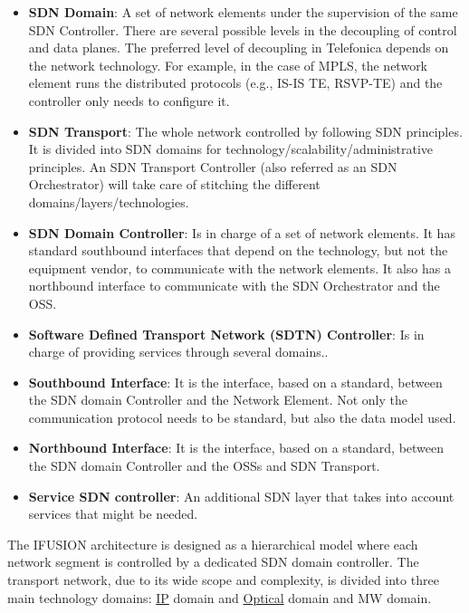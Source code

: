 \documentclass[a4paper,fleqn]{cas-dc}
\begin{document}
\begin{itemize}
\item \textbf{SDN Domain}: A set of network elements under the supervision of the same SDN Controller. There are several possible levels in the decoupling of control and data planes. The preferred level of decoupling in Telefonica depends on the network technology. For example, in the case of MPLS, the network element runs the distributed protocols (e.g., IS-IS TE, RSVP-TE) and the controller only needs to configure it.

\item \textbf{SDN Transport}: The whole network controlled by following SDN principles. It is divided into SDN domains for technology/scalability/administrative principles. An SDN Transport Controller (also referred as an SDN Orchestrator) will take care of stitching the different domains/layers/technologies.

\item \textbf{SDN Domain Controller}: Is in charge of a set of network elements. It has standard southbound interfaces that depend on the technology, but not the equipment vendor, to communicate with the network elements. It also has a northbound interface to communicate with the SDN Orchestrator and the OSS.

\item \textbf{Software Defined Transport Network (SDTN) Controller}: Is in charge of providing services through several domains.. 

\item \textbf{Southbound Interface}: It is the interface, based on a standard, between the SDN domain Controller and the Network Element. Not only the communication protocol needs to be standard, but also the data model used.

\item \textbf{Northbound Interface}: It is the interface, based on a standard, between the SDN domain Controller and the OSSs and SDN Transport.

\item \textbf{Service SDN controller}: An additional SDN layer that takes into account services that might be needed. 
\end{itemize}

The \uppercase{iFUSION} architecture is designed as a hierarchical model where each network segment is controlled by a dedicated SDN domain controller. The transport network, due to its wide scope and complexity, is divided into three main technology domains: \hyperref[section:ip]{IP} domain and \hyperref[section:dwdm]{Optical} domain and MW domain.  
\end{document}
